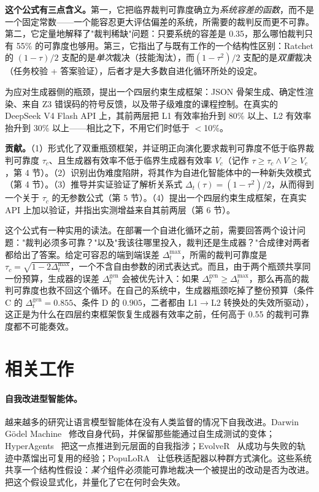 \documentclass{article}
\begin{document}
\textbf{这个公式有三点含义。}第一，它把临界裁判可靠度确立为\textit{系统容差的函数}，而不是一个固定常数——一个能容忍更大评估偏差的系统，所需要的裁判反而更不可靠。第二，它定量地解释了"裁判稀缺"问题：只要系统的容差是 0.35，那么哪怕裁判只有 55\% 的可靠度也够用。第三，它指出了与既有工作的一个结构性区别：Ratchet 的 $(1-\tau)/2$ 支配的是\textit{单次}裁决（技能淘汰），而$(1-\tau^2)/2$ 支配的是\textit{双重}裁决（任务校验 + 答案验证），后者才是大多数自进化循环所处的设定。

为应对生成器侧的瓶颈，提出一个四层约束生成框架：JSON 骨架生成、确定性渲染、来自 Z3 错误码的符号反馈，以及带子级难度的课程控制。在真实的 DeepSeek V4 Flash API 上，其前两层把 L1 有效率抬升到 80\% 以上、L2 有效率抬升到 30\% 以上——相比之下，不用它们时低于 $<$10\%。

\textbf{贡献。}（1）形式化了双重瓶颈框架，并证明正向演化要求裁判可靠度不低于临界裁判可靠度 $\tau_c$、且生成器有效率不低于临界生成器有效率 $V_c$（记作 $\tau \ge \tau_c \land V \ge V_c$，第 4 节）。（2）识别出伪难度陷阱，将其作为自进化智能体中的一种新失效模式（第 4 节）。（3）推导并实证验证了解析关系式 $\Delta_t(\tau) = (1-\tau^2)/2$，从而得到一个关于 $\tau_c$ 的无参数公式（第 5 节）。（4）提出一个四层约束生成框架，在真实 API 上加以验证，并指出实测增益来自其前两层（第 6 节）。

这个公式有一种实用的读法。在部署一个自进化循环之前，需要回答两个设计问题："裁判必须多可靠？"以及"我该往哪里投入，裁判还是生成器？"合成律对两者都给出了答案。给定可容忍的端到端误差 $\Delta_t^{\max}$，所需的裁判可靠度是 $\tau_c = \sqrt{1 - 2\Delta_t^{\max}}$，一个不含自由参数的闭式表达式。而且，由于两个瓶颈共享同一份预算，生成器的误差 $\Delta_t^{\mathrm{gen}}$ 会被优先计入：如果 $\Delta_t^{\mathrm{gen}} \ge \Delta_t^{\max}$，那么再高的裁判可靠度也救不回这个循环。在自己的系统中，生成器瓶颈吃掉了整份预算（条件 C 的 $\Delta_t^{\mathrm{gen}} = 0.855$、条件 D 的 $0.905$，二者都由 L1$\to$L2 转换处的失效所驱动），这正是为什么在四层约束框架恢复生成器有效率之前，任何高于 0.55 的裁判可靠度都不可能奏效。

\section{相关工作}

\paragraph{自我改进型智能体。}
越来越多的研究让语言模型智能体在没有人类监督的情况下自我改进。Darwin Gödel Machine~\cite{dgm} 修改自身代码，并保留那些能通过自生成测试的变体；HyperAgents~\cite{hyperagents} 把这一点推进到元层面的自我指涉；EvolveR~\cite{evolver} 从成功与失败的轨迹中蒸馏出可复用的经验；PopuLoRA~\cite{populora} 让低秩适配器以种群方式演化。这些系统共享一个结构性假设：\emph{某个}组件必须能可靠地裁决一个被提出的改动是否为改进。把这个假设显式化，并量化了它在何时会失效。
\end{document}
